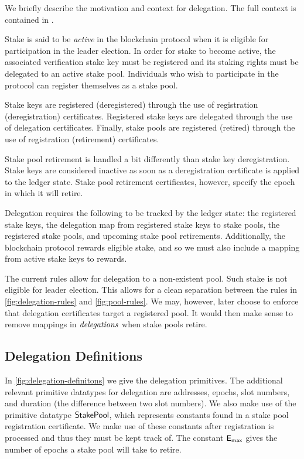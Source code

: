 
We briefly describe the motivation and context for delegation.
The full context is contained in \cite{delegation_design}.

Stake is said to be \textit{active} in the blockchain protocol
when it is eligible for participation in the leader election. In order for
stake to become active,
the associated verification stake key must be registered
and its staking rights must be delegated to an active stake pool.
Individuals who wish to participate in the protocol can
register themselves as a stake pool.

Stake keys are registered (deregistered) through the use of
registration (deregistration) certificates.
Registered stake keys are delegated through the use of delegation certificates.
Finally, stake pools are registered (retired) through the use of
registration (retirement) certificates.

Stake pool retirement is handled a bit differently than stake key deregistration.
Stake keys are considered inactive as soon as a deregistration certificate
is applied to the ledger state.
Stake pool retirement certificates, however, specify the epoch in
which it will retire.

Delegation requires the following to be tracked by the ledger state:
the registered stake keys, the delegation map from registered stake keys to stake
pools, the registered stake pools, and upcoming stake pool retirements.
Additionally, the blockchain protocol rewards eligible stake, and so we must
also include a mapping from active stake keys to rewards.



\begin{note}
  The current rules allow for delegation to a non-existent pool.
  Such stake is not eligible for leader election.
  This allows for a clean separation between the rules in
  \cref{fig:delegation-rules} and \cref{fig:pool-rules}.
  We may, however, later choose to enforce that delegation certificates
  target a registered pool. It would then make sense to remove
  mappings in $\mathit{delegations}$ when stake pools retire.
\end{note}


\subsection{Delegation Definitions}
\label{sec:deleg-defs}

In \cref{fig:delegation-definitons} we give the delegation primitives.
The additional relevant primitive datatypes for delegation are addresses,
epochs, slot numbers, and duration (the difference between two slot numbers).
We also make use of the primitive datatype $\mathsf{StakePool}$, which represents
constants found in a stake pool registration certificate. We make use of
these constants after registration is processed and thus they must be kept
track of.
The constant $\mathsf{E_{max}}$ gives the number of epochs a stake pool will take to retire.

